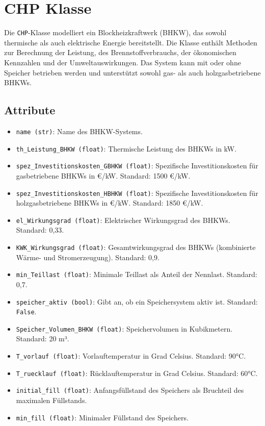 \section{CHP Klasse}
Die \texttt{CHP}-Klasse modelliert ein Blockheizkraftwerk (BHKW), das sowohl thermische als auch elektrische Energie bereitstellt. Die Klasse enthält Methoden zur Berechnung der Leistung, des Brennstoffverbrauchs, der ökonomischen Kennzahlen und der Umweltauswirkungen. Das System kann mit oder ohne Speicher betrieben werden und unterstützt sowohl gas- als auch holzgasbetriebene BHKWs.

\subsection{Attribute}
\begin{itemize}
    \item \texttt{name (str)}: Name des BHKW-Systems.
    \item \texttt{th\_Leistung\_BHKW (float)}: Thermische Leistung des BHKWs in kW.
    \item \texttt{spez\_Investitionskosten\_GBHKW (float)}: Spezifische Investitionskosten für gasbetriebene BHKWs in €/kW. Standard: 1500 €/kW.
    \item \texttt{spez\_Investitionskosten\_HBHKW (float)}: Spezifische Investitionskosten für holzgasbetriebene BHKWs in €/kW. Standard: 1850 €/kW.
    \item \texttt{el\_Wirkungsgrad (float)}: Elektrischer Wirkungsgrad des BHKWs. Standard: 0,33.
    \item \texttt{KWK\_Wirkungsgrad (float)}: Gesamtwirkungsgrad des BHKWs (kombinierte Wärme- und Stromerzeugung). Standard: 0,9.
    \item \texttt{min\_Teillast (float)}: Minimale Teillast als Anteil der Nennlast. Standard: 0,7.
    \item \texttt{speicher\_aktiv (bool)}: Gibt an, ob ein Speichersystem aktiv ist. Standard: \texttt{False}.
    \item \texttt{Speicher\_Volumen\_BHKW (float)}: Speichervolumen in Kubikmetern. Standard: 20 m³.
    \item \texttt{T\_vorlauf (float)}: Vorlauftemperatur in Grad Celsius. Standard: 90°C.
    \item \texttt{T\_ruecklauf (float)}: Rücklauftemperatur in Grad Celsius. Standard: 60°C.
    \item \texttt{initial\_fill (float)}: Anfangsfüllstand des Speichers als Bruchteil des maximalen Füllstands.
    \item \texttt{min\_fill (float)}: Minimaler Füllstand des Speichers.

\end{itemize}
